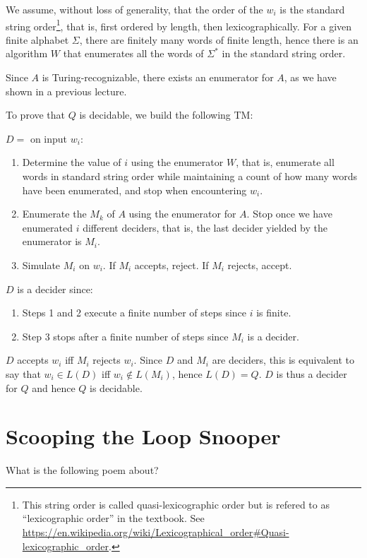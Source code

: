 \documentclass{article}
\newcommand{\TM}{TM}
\begin{document}
We assume,
without loss of generality, that the order of the \(w_i\) is the standard
string order\footnote{%
This string order is called quasi-lexicographic order but is refered to as
``lexicographic order'' in the textbook. See
\url{https://en.wikipedia.org/wiki/Lexicographical\_order\#Quasi-lexicographic\_order}.
}, that is, first ordered by length, then lexicographically.
For a given finite alphabet \(\Sigma\), there are finitely many words of finite
length, hence there is an algorithm \(W\) that enumerates all the words of \(\Sigma^*\)
in the standard string order.

Since \(A\) is Turing-recognizable, there exists an enumerator
for \(A\), as we have shown in a previous lecture.

To prove that \(Q\) is decidable, we build the following \TM{}:

\(D =\) on input \(w_i\):
\begin{enumerate}
\item Determine the value of \(i\) using the enumerator \(W\), that is,
enumerate all words in standard string order while maintaining a count of how
many words have been enumerated, and stop when encountering \(w_i\).
\item Enumerate the \(M_k\) of \(A\) using the enumerator for \(A\). Stop once
we have enumerated \(i\) different deciders, that is, the last decider yielded
by the enumerator is \(M_i\).
\item Simulate \(M_i\) on \(w_i\). If \(M_i\) accepts, reject. If \(M_i\) rejects, accept.
\end{enumerate}

\(D\) is a decider since:
\begin{enumerate}
\item Steps 1 and 2 execute a finite number of steps since \(i\) is finite.
\item Step 3 stops after a finite number of steps since \(M_i\) is a decider.
\end{enumerate}

\(D\) accepts \(w_i\) iff \(M_i\) rejects \(w_i\). Since \(D\) and \(M_i\) are
deciders, this is equivalent to say
that \(w_i \in L(D)\) iff \(w_i \not\in L(M_i)\), hence \(L(D) = Q\).
\(D\) is thus a decider for \(Q\) and hence \(Q\) is decidable.

\section{Scooping the Loop Snooper}
What is the following poem about?
\end{document}
